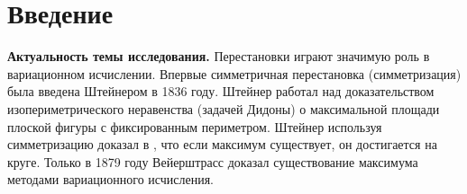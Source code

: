 \chapter*{Введение}							%

\newcommand{\actuality}{}
\newcommand{\progress}{}
\newcommand{\aim}{{\textbf\aimTXT}}
\newcommand{\tasks}{\textbf{\tasksTXT}}
\newcommand{\novelty}{\textbf{\noveltyTXT}}
\newcommand{\influence}{\textbf{\influenceTXT}}
\newcommand{\methods}{\textbf{\methodsTXT}}
\newcommand{\defpositions}{\textbf{\defpositionsTXT}}
\newcommand{\reliability}{\textbf{\reliabilityTXT}}
\newcommand{\probation}{\textbf{\probationTXT}}
\newcommand{\contribution}{\textbf{\contributionTXT}}
\newcommand{\publications}{\textbf{\publicationsTXT}}

%






{\actuality}

\textbf{Актуальность темы исследования.}
Перестановки играют значимую роль в вариационном исчислении.
Впервые симметричная перестановка (симметризация) была введена Штейнером в 1836 году.
Штейнер работал над доказательством изопериметрического неравенства (задачей Дидоны)
о максимальной площади плоской фигуры с фиксированным периметром.
Штейнер используя симметризацию доказал в \cite{Steiner}, что если максимум существует, он достигается на круге.
Только в 1879 году Вейерштрасс доказал существование максимума методами вариационного исчисления.

